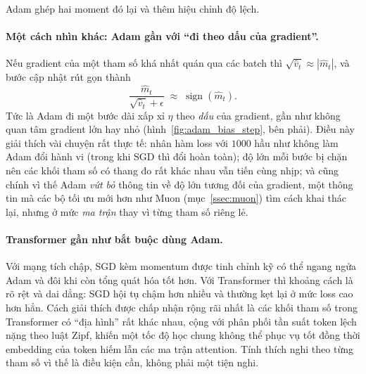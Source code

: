 \begin{center}
\label{fig:optimizer_trajectories}
\end{center}

\noindent Adam ghép hai moment đó lại và thêm hiệu chỉnh độ lệch.

\paragraph{Một cách nhìn khác: Adam gần với “đi theo dấu của gradient”.} Nếu gradient của một tham số khá nhất quán qua các batch thì $\sqrt{\hat{v}_t} \approx |\hat{m}_t|$, và bước cập nhật rút gọn thành
\[
\frac{\hat{m}_t}{\sqrt{\hat{v}_t} + \epsilon} \;\approx\; \operatorname{sign}(\hat{m}_t) .
\]
Tức là Adam đi một bước dài xấp xỉ $\eta$ theo \emph{dấu} của gradient, gần như không quan tâm gradient lớn hay nhỏ \cite{balles2018dissecting} (hình~\ref{fig:adam_bias_step}, bên phải). Điều này giải thích vài chuyện rất thực tế: nhân hàm loss với $1000$ hầu như không làm Adam đổi hành vi (trong khi SGD thì đổi hoàn toàn); độ lớn mỗi bước bị chặn nên các khối tham số có thang đo rất khác nhau vẫn tiến cùng nhịp; và cũng chính vì thế Adam \emph{vứt bỏ} thông tin về độ lớn tương đối của gradient, một thông tin mà các bộ tối ưu mới hơn như Muon (mục~\ref{ssec:muon}) tìm cách khai thác lại, nhưng ở mức \emph{ma trận} thay vì từng tham số riêng lẻ.

\paragraph{Transformer gần như bắt buộc dùng Adam.} Với mạng tích chập, SGD kèm momentum được tinh chỉnh kỹ có thể ngang ngửa Adam và đôi khi còn tổng quát hóa tốt hơn. Với Transformer thì khoảng cách là rõ rệt và dai dẳng: SGD hội tụ chậm hơn nhiều và thường kẹt lại ở mức loss cao hơn hẳn. Cách giải thích được chấp nhận rộng rãi nhất là các khối tham số trong Transformer có “địa hình” rất khác nhau, cộng với phân phối tần suất token lệch nặng theo luật Zipf, khiến một tốc độ học chung không thể phục vụ tốt đồng thời embedding của token hiếm lẫn các ma trận attention. Tính thích nghi theo từng tham số vì thế là điều kiện cần, không phải một tiện nghi.

